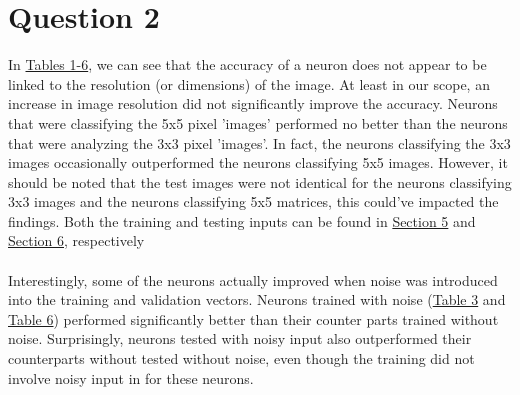 \documentclass{article}
\begin{document}
\section{Question 2}
In \hyperref[T1]{Tables 1-6}, we can see that the accuracy of a neuron does not appear to be linked to the resolution (or dimensions) of the image. At least in our scope, an increase in image resolution did not significantly improve the accuracy. Neurons that were classifying the 5x5 pixel 'images' performed no better than the neurons that were analyzing the 3x3 pixel 'images'. In fact, the neurons classifying the 3x3 images occasionally outperformed the neurons classifying 5x5 images. However, it should be noted that the test images were not identical for the neurons classifying 3x3 images and the neurons classifying 5x5 matrices, this could've impacted the findings. Both the training and testing inputs can be found in \hyperref[S5]{Section 5} and \hyperref[S6]{Section 6}, respectively\\ \\ Interestingly, some of the neurons actually improved when noise was introduced into the training and validation vectors. Neurons trained with noise (\hyperref[T3]{Table 3} and \hyperref[T6]{Table 6}) performed significantly better than their counter parts trained without noise. Surprisingly, neurons tested with noisy input also outperformed their counterparts without tested without noise, even though the training did not involve noisy input in for these neurons.
\end{document}
